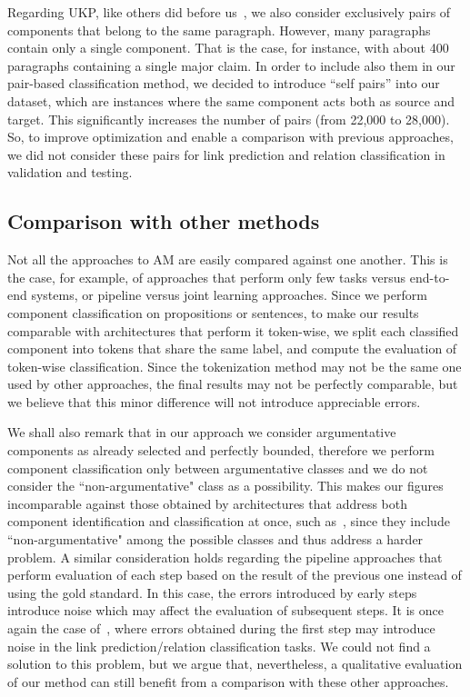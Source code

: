 \documentclass[journal]{IEEEtran}
\begin{document}
Regarding UKP, like others did before us~\cite{stab2017parsing,DBLP:conf/acl/NiculaePC17}, we also consider exclusively pairs of components that belong to the same paragraph. However, many paragraphs contain only a single component. That is the case, for instance, with about 400 paragraphs containing a single major claim. In order to include also them in our pair-based classification method, we decided to introduce ``self pairs'' into our dataset, which are instances where the same component acts both as source and target. This significantly increases the number of pairs (from 22,000 to 28,000). So, to improve optimization and enable a comparison with previous approaches, we did not consider these pairs for link prediction and relation classification in validation and testing.


\subsection{Comparison with other methods}

Not all the approaches to AM are easily compared against one another. This is the case, for example, of approaches that perform only few tasks versus end-to-end systems, or pipeline versus joint learning approaches.
Since we perform component classification on propositions or sentences, to make our results comparable with architectures that perform it token-wise, we split each classified component into tokens that share the same label, and compute the evaluation of token-wise classification. Since the tokenization method may not be the same one used by other approaches, the final results may not be perfectly comparable, but we believe that this minor difference will not introduce appreciable errors.

We shall also remark that in our approach we consider argumentative components as already selected and perfectly bounded, therefore we perform component classification only between argumentative classes and we do not consider the ``non-argumentative" class as a possibility. This makes our figures incomparable against those obtained by architectures that address both component identification and classification at once, such as~\cite{DBLP:conf/ecai/0002CV20}, since they include ``non-argumentative" among the possible classes and thus address a harder problem.
A similar consideration holds regarding the pipeline approaches that perform evaluation of each step based on the result of the previous one instead of using the gold standard. In this case, the errors introduced by early steps introduce noise which may affect the evaluation of subsequent steps.
It is once again the case of~\cite{DBLP:conf/ecai/0002CV20}, where errors obtained during the first step may introduce noise in the link prediction/relation classification tasks. 
We could not find a solution to this problem, but we argue that, nevertheless, a qualitative evaluation of our method can still benefit from a comparison with these other approaches.
\end{document}
